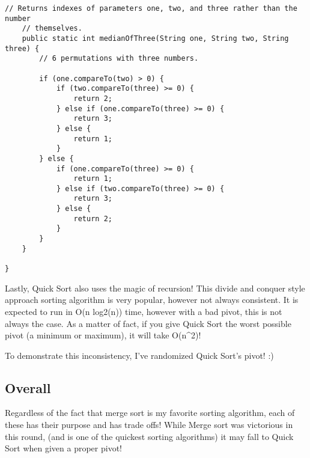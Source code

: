 \documentclass[letterpaper, 10pt,DIV=13]{scrartcl}
\numberwithin{equation}{section} %
\numberwithin{figure}{section} %
\numberwithin{table}{section} %
\begin{document}
\begin{lstlisting}[frame=single, ]
    // Returns indexes of parameters one, two, and three rather than the number
    // themselves.
    public static int medianOfThree(String one, String two, String three) {
        // 6 permutations with three numbers.

        if (one.compareTo(two) > 0) {
            if (two.compareTo(three) >= 0) {
                return 2;
            } else if (one.compareTo(three) >= 0) {
                return 3;
            } else {
                return 1;
            }
        } else {
            if (one.compareTo(three) >= 0) {
                return 1;
            } else if (two.compareTo(three) >= 0) {
                return 3;
            } else {
                return 2;
            }
        }
    }

}
\end{lstlisting}
Lastly, Quick Sort also uses the magic of recursion! This divide and conquer style approach sorting algorithm is very popular, however not always consistent. It is expected to run in O(n log2(n)) time, however with a bad pivot, this is not always the case. As a matter of fact, if you give Quick Sort the worst possible pivot (a minimum or maximum), it will take O(n^{2})!

To demonstrate this inconsistency, I've randomized Quick Sort's pivot! :)



\subsection{Overall}
Regardless of the fact that merge sort is my favorite sorting algorithm, each of these has their purpose and has trade offs! While Merge sort was victorious in this round, (and is one of the quickest sorting algorithms) it may fall to Quick Sort when given a proper pivot! 
\end{document}
